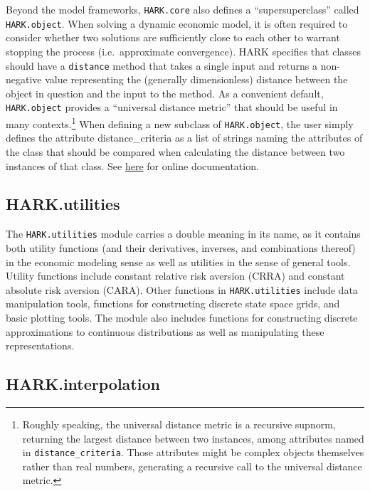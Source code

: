 \message{ !name(ccarroll_et_al_scipy_2018.tex)}\documentclass[10pt,twocolumn]{article}
\let\rmarkdownfootnote\footnote%
\def\footnote{\protect\rmarkdownfootnote}
\begin{document}
Beyond the model frameworks, \texttt{HARK.core} also defines a ``supersuperclass'' called \texttt{HARK.object}. When solving a dynamic economic model, it is often required to consider whether two solutions are sufficiently close to each other to warrant stopping the process (i.e.~approximate convergence). HARK specifies that classes should have a \texttt{distance} method that takes a single input and returns a non-negative value representing the (generally dimensionless) distance between the object in question and the input to the method. As a convenient default, \texttt{HARK.object} provides a ``universal distance metric'' that should be useful in many contexts.\footnote{Roughly speaking, the universal distance metric is a recursive supnorm, returning the largest distance between two instances, among attributes named in \texttt{distance\_criteria}. Those attributes might be complex objects themselves rather than real numbers, generating a recursive call to the universal distance metric.} When defining a new subclass of \texttt{HARK.object}, the user simply defines the attribute distance\_criteria as a list of strings naming the attributes of the class that should be compared when calculating the distance between two instances of that class. See \href{https://econ-\%20ark.github.io/HARK/generated/HARK.core.html}{here} for online documentation.

\subsection{HARK.utilities}\label{harkutilities}

The \texttt{HARK.utilities} module carries a double meaning in its name,
as it contains both utility functions (and their derivatives, inverses,
and combinations thereof) in the economic modeling sense as well as
utilities in the sense of general tools. Utility functions include
constant relative risk aversion (CRRA) and constant absolute risk
aversion (CARA). Other functions in \texttt{HARK.utilities} include data
manipulation tools, functions for constructing discrete state space
grids, and basic plotting tools. The module also includes functions for
constructing discrete approximations to continuous distributions as well
as manipulating these representations.

\subsection{HARK.interpolation}\label{harkinterpolation}
\end{document}
